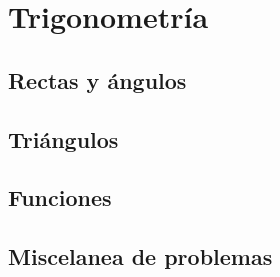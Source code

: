 \chapter{Trigonometría}
\section{Rectas y ángulos}
\section{Triángulos}
\section{Funciones}
\section{Miscelanea de problemas}